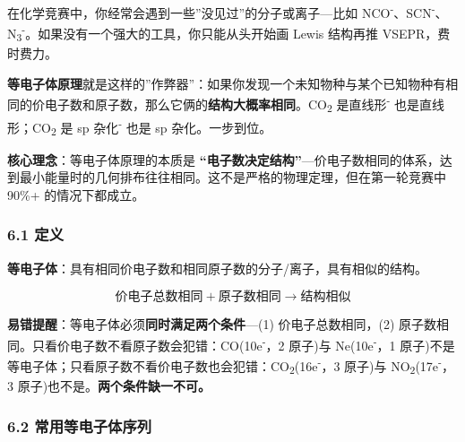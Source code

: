 \documentclass[a4paper,11pt]{ctexart}
\newcommand{\箭}{\ensuremath{\rightarrow}}
\newcommand{\左箭}{\ensuremath{\leftarrow}}
\newcommand{\上箭}{\ensuremath{\uparrow}}
\newcommand{\下箭}{\ensuremath{\downarrow}}
\newcommand{\衡}{\ensuremath{\rightleftharpoons}}
\newcommand{\双箭}{\ensuremath{\leftrightarrow}}
\newcommand{\约等于}{\ensuremath{\approx}}
\newcommand{\小于等于}{\ensuremath{\leq}}
\newcommand{\大于等于}{\ensuremath{\geq}}
\newcommand{\不等于}{\ensuremath{\neq}}
\newcommand{\西格马}{\ensuremath{\sigma}}
\newcommand{\派}{\ensuremath{\pi}}
\begin{document}
在化学竞赛中，你经常会遇到一些''没见过''的分子或离子---比如 NCO\textsuperscript{-}、SCN\textsuperscript{-}、N\textsubscript{3}\textsuperscript{-}。如果没有一个强大的工具，你只能从头开始画 Lewis 结构再推 VSEPR，费时费力。

\textbf{等电子体原理}就是这样的''作弊器''：如果你发现一个未知物种与某个已知物种有相同的价电子数和原子数，那么它俩的\textbf{结构大概率相同}。CO\textsubscript{2} 是直线形\textsuperscript{-} 也是直线形；CO\textsubscript{2} 是 sp 杂化\textsuperscript{-} 也是 sp 杂化。一步到位。

\textbf{核心理念}：等电子体原理的本质是 \textbf{``电子数决定结构''}---价电子数相同的体系，达到最小能量时的几何排布往往相同。这不是严格的物理定理，但在第一轮竞赛中 90\%+ 的情况下都成立。

\subsubsection{6.1 定义}\label{ux5b9aux4e49}

\textbf{等电子体}：具有相同价电子数和相同原子数的分子/离子，具有相似的结构。

\[
\text{价电子总数相同} + \text{原子数相同} \rightarrow \text{结构相似}
\]

\textbf{易错提醒}：等电子体必须\textbf{同时满足两个条件}---(1) 价电子总数相同，(2) 原子数相同。只看价电子数不看原子数会犯错：CO(10e\textsuperscript{-}，2 原子)与 Ne(10e\textsuperscript{-}，1 原子)不是等电子体；只看原子数不看价电子数也会犯错：CO\textsubscript{2}(16e\textsuperscript{-}，3 原子)与 NO\textsubscript{2}(17e\textsuperscript{-}，3 原子)也不是。\textbf{两个条件缺一不可。}

\subsubsection{6.2 常用等电子体序列}\label{ux5e38ux7528ux7b49ux7535ux5b50ux4f53ux5e8fux5217}
\end{document}
